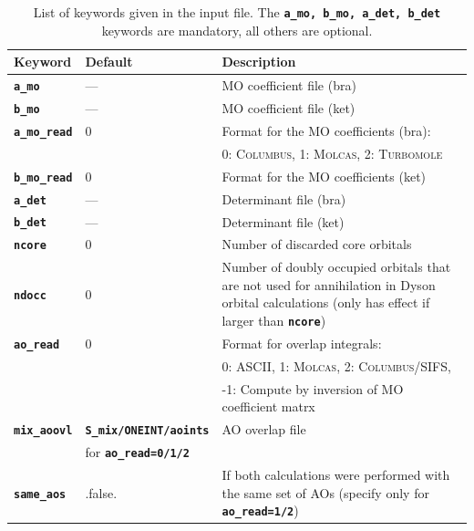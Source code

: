 \documentclass[a4paper,10pt,DIV=15,openany]{scrbook}
\newcommand{\ttt}[1]{\textbf{\texttt{#1}}}
\begin{document}
\begin{table}[tb]
  \caption[List of keywords given in the input file.]{List of keywords given in the input file. The \ttt{a\_mo, b\_mo, a\_det, b\_det} keywords are mandatory, all others are optional.}
  \label{tab:key_wfo}
  \begin{tabular}{llp{9cm}}
    \hline
    Keyword & Default & Description \\
    \hline
    \ttt{a\_mo}                 & ---                           & MO coefficient file (bra)\\
    \ttt{b\_mo}                 & ---                           & MO coefficient file (ket)\\
    \ttt{a\_mo\_read}           & 0                             & Format for the MO coefficients (bra):\\
                                                                && 0: \textsc{Columbus}, 1: \textsc{Molcas}, 2: \textsc{Turbomole}\\
    \ttt{b\_mo\_read}           & 0                             & Format for the MO coefficients (ket)\\
    \ttt{a\_det}                & ---                           & Determinant file (bra)\\
    \ttt{b\_det}                & ---                           & Determinant file (ket)\\
    \ttt{ncore}                 & 0                             & Number of discarded core orbitals\\
    \ttt{ndocc}                 & 0                             & Number of doubly occupied orbitals that are not used for 
                                                                annihilation in Dyson orbital calculations (only has effect if larger than \ttt{ncore})\\
    \ttt{ao\_read}              & 0                             & Format for overlap integrals:\\
                                                                &&0: ASCII, 1: \textsc{Molcas}, 2: \textsc{Columbus/SIFS},\\
                                                                &&-1: Compute by inversion of MO coefficient matrx\\
    \ttt{mix\_aoovl}            & \ttt{S\_mix/ONEINT/aoints}    & AO overlap file\\
                                & for \ttt{ao\_read=0/1/2}      &\\
    \ttt{same\_aos}             & .false.                       & If both calculations were performed with the same set of AOs (specify only for \ttt{ao\_read=1/2})\\

\end{tabular}
\end{table}
\end{document}
